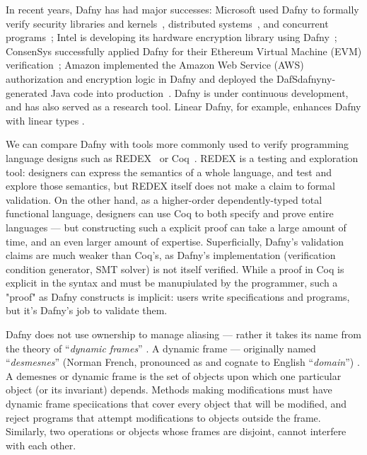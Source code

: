 In recent years, Dafny has had major successes: Microsoft used Dafny to formally verify security libraries and kernels~\cite{DBLP:conf/sosp/KleinEHACDEEKNSTW09,DBLP:journals/sigops/ErbsenPGSC20}, distributed systems~\cite{ironfleet-sosp2015}, and concurrent programs~\cite{DBLP:conf/osdi/HawblitzelHLNPZZ14}; Intel is developing its hardware encryption library using Dafny~\cite{DBLP:journals/iacr/YangWCCY23}; ConsenSys successfully applied Dafny for their Ethereum Virtual Machine (EVM) verification~\cite{cassex-eth-fm2023}; Amazon implemented the Amazon Web Service (AWS) authorization and encryption logic in Dafny and deployed the DafSdafnyny-generated Java code into production~\cite{counterexamples-tacas2022}.
Dafny is under continuous development, and has also served as a
research tool. Linear Dafny, for example, enhances Dafny with linear
types \cite{linear-dafny-oopsla2022}.

We can compare Dafny with tools more commonly used to verify
programming language designs such as REDEX~\cite{PLTRedex} or
Coq~\cite{coq,coqbook}.  REDEX is a testing and exploration tool:
designers can express the semantics of a whole language, and test and
explore those semantics, but REDEX itself does not make a claim to
formal validation.  On the other hand, as a higher-order
dependently-typed total functional language, designers can use Coq to
both specify and prove entire languages --- but constructing such a
explicit proof can take a large amount of time, and an even larger
amount of expertise.  Superficially, Dafny's validation claims are
much weaker than Coq's, as Dafny's implementation (verification
condition generator, SMT solver) is not itself verified.  While a
proof in Coq is explicit in the syntax and must be manupiulated by the
programmer, such a "proof" as Dafny constructs is implicit: users
write specifications and programs, but it's Dafny's job to validate
them.


Dafny does not use ownership to manage aliasing --- rather it takes
its name from the theory of ``\textit{dynamic frames}''
\cite{dynamic-frames-fm2006,dynamic-frames-fac2011}.  A dynamic frame
--- originally named ``\textit{desmesnes}'' (Norman French, pronounced
as and cognate to English ``\textit{domain}'') \cite{wills91,wills92}.
A demesnes or dynamic frame is the set of objects upon which one
particular object (or its invariant) depends.  Methods making
modifications must have dynamic frame speciications that cover every
object that will be modified, and reject programs that attempt
modifications to objects outside the frame. Similarly, two operations
or objects whose frames are disjoint, cannot interfere with each
other.
